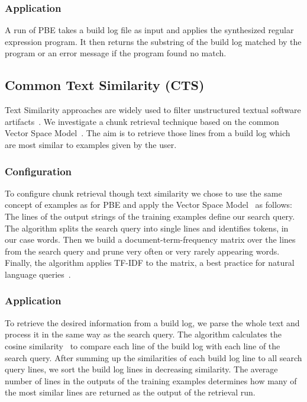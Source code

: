 \subsubsection{Application}
A run of PBE takes a build log file as input and applies the
synthesized regular expression program.
It then returns the substring
of the build log matched by the program or an error message if the
program found no match.


\subsection{Common Text Similarity (CTS)}
\label{sec:expl-ts}
Text Similarity approaches are widely used to filter unstructured
textual software artifacts~\cite{runeson2007detection,
marcus2005recovery,antoniol2002recovering,mccarey2006recommending}.
We investigate a chunk retrieval technique based on the common
Vector Space Model~\cite{schutze2008introduction}.
The aim is to retrieve those lines from a build log which are most
similar to examples given by the user.

\subsubsection{Configuration}
To configure chunk retrieval though text similarity we chose to use
the same concept of examples as for PBE
and apply the Vector Space Model~\cite{schutze2008introduction}
as follows:
The lines of the output strings of the training examples define our
search query.
The algorithm splits the search query into single lines and
identifies tokens, in our case words.
Then we build a
document-term-frequency matrix over the lines from the search query
and prune very often or very rarely appearing words.
Finally, the
algorithm applies TF-IDF to the matrix, a best practice for natural
language queries~\cite{lee1997document}.

\subsubsection{Application}
To retrieve the desired information from a build log, we parse the
whole text and process it in the same way as the search query.
The algorithm calculates the cosine
similarity~\cite{korenius2007principal} to compare each line of the
build log with each line of the search query.
After summing up the
similarities of each build log line to all search query lines, we sort
the build log lines in decreasing similarity.
The average number of
lines in the outputs of the training examples determines how many of
the most similar lines are returned as the output of the retrieval
run.

